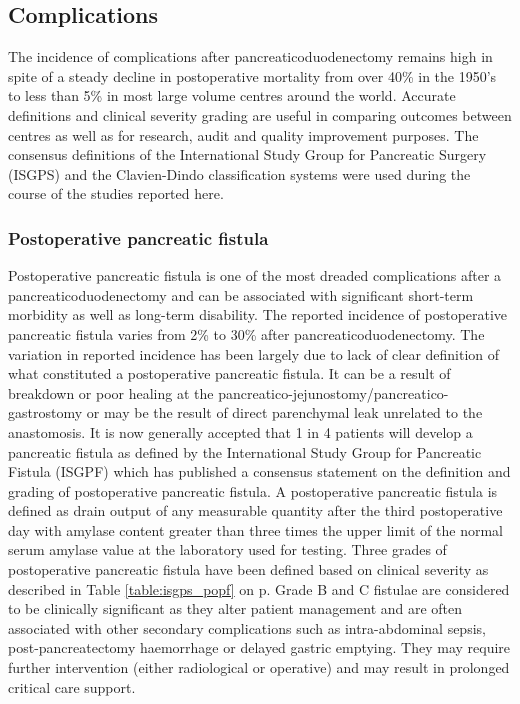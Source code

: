 \subsection{Complications}
The incidence of complications after pancreaticoduodenectomy remains high in spite of a steady decline in postoperative mortality from over 40\% in the 1950's to less than 5\% in most large volume centres around the world.\parencite{deoliveira_assessment_2006, emick_hospital_2006, yeo_six_1997, winter_1423_2006, teh_patient_2009, gouma_rates_2000} Accurate definitions and clinical severity grading are useful in comparing outcomes between centres as well as for research, audit and quality improvement purposes. The consensus definitions of the International Study Group for Pancreatic Surgery (ISGPS) and the Clavien-Dindo classification systems were used during the course of the studies reported here.


\subsubsection{Postoperative pancreatic fistula}
\label{sec:ch_intro_POPF}



Postoperative pancreatic fistula is one of the most dreaded complications after a pancreaticoduodenectomy and can be associated with significant short-term morbidity as well as long-term disability. The reported incidence of postoperative pancreatic fistula varies from 2\% to 30\% after pancreaticoduodenectomy.\parencite{yeo_six_1997,deoliveira_assessment_2006,bassi_postoperative_2005,winter_biochemical_2007,pratt_risk_2008} 
The variation in reported incidence has been largely due to lack of clear definition of what constituted a postoperative pancreatic fistula. It can be a result of breakdown or poor healing at the pancreatico-jejunostomy/pancreatico-gastrostomy or may be the result of direct parenchymal leak unrelated to the anastomosis. It is now generally accepted that 1 in 4 patients will develop a pancreatic fistula as defined by the International Study Group for Pancreatic Fistula (ISGPF) which has published a consensus statement on the definition and grading of postoperative pancreatic fistula.\parencite{bassi_postoperative_2005} A postoperative pancreatic fistula is defined as drain output of any measurable quantity after the third postoperative day with amylase content greater than three times the upper limit of the normal serum amylase value at the laboratory used for testing. Three grades of postoperative pancreatic fistula have been defined based on clinical severity as described in Table \ref{table:isgps_popf} on p\pageref{table:isgps_popf}. Grade B and C fistulae are considered to be clinically significant as they alter patient management and are often associated with other secondary complications such as intra-abdominal sepsis, post-pancreatectomy haemorrhage or delayed gastric emptying. They may require further intervention (either radiological or operative) and may result in prolonged critical care support.

